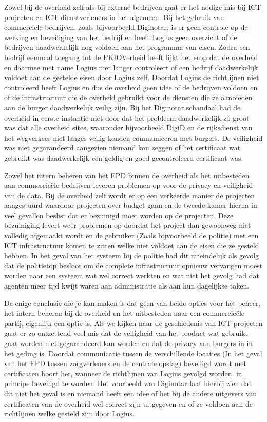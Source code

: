 Zowel bij de overheid zelf als bij externe bedrijven gaat er het nodige mis bij ICT projecten en ICT dienstverleners in het algemeen. Bij het gebruik van commerciele bedrijven, zoals bijvoorbeeld Diginotar, is er geen controle op de werking en beveiliging van het bedrijf en heeft Logius geen overzicht of de bedrijven daadwerkelijk nog voldoen aan het programma van eisen. Zodra een bedrijf eenmaal toegang tot de PKIOVerheid heeft lijkt het erop dat de overheid en daarmee met name Logius niet langer controleert of een bedrijf daadwerkelijk voldoet aan de gestelde eisen door Logius zelf. Doordat Logius de richtlijnen niet controleerd heeft Logius en dus de overheid geen idee of de bedrijven voldoen en of de infrastructuur die de overheid gebruikt voor de diensten die ze aanbieden aan de burger daadwerkelijk veilig zijn. Bij het Diginotar schandaal had de overheid in eerste instantie niet door dat het probleem daadwerkelijk zo groot was dat alle overheid sites, waaronder bijvoorbeeld DigiD en de rijksdienst van het wegverkeer niet langer veilig konden communiceren met burgers. De veiligheid was niet gegarandeerd aangezien niemand kon zeggen of het certificaat wat gebruikt was daadwerkelijk een geldig en goed gecontroleerd certificaat was.

Zowel het intern beheren van het EPD binnen de overheid als het uitbesteden aan commercie\"{e}le bedrijven leveren problemen op voor de privacy en veiligheid van de data. Bij de overheid zelf wordt er op een verkeerde manier de projecten aangestuurd waardoor projecten over budget gaan en de tweede kamer hierna in veel gevallen beslist dat er bezuinigd moet worden op de projecten. Deze bezuiniging levert weer problemen op doordat het project dan gewoonweg niet volledig afgemaakt wordt en de gebruiker (Zoals bijvoorbeeld de politie) met een ICT infrastructuur komen te zitten welke niet voldoet aan de eisen die ze gesteld hebben. In het geval van het systeem bij de politie had dit uiteindelijk als gevolg dat de politietop besloot om de complete infrastructuur opnieuw vervangen moest worden naar een systeem wat wel correct werkten en wat niet het gevolg had dat agenten meer tijd kwijt waren aan administratie als aan hun dagelijkse taken.

De enige conclusie die je kan maken is dat geen van beide opties voor het beheer, het intern beheren bij de overheid en het uitbesteden naar een commercie\"{e}le partij, eigenlijk een optie is. Als we kijken naar de geschiedenis van ICT projecten gaat er zo ontzettend veel mis dat de veiligheid van het product wat gebruikt gaat worden niet gegarandeerd kan worden en dat de privacy van burgers in in het geding is. Doordat communicatie tussen de verschillende locaties (In het geval van het EPD tussen zorgverleners en de centrale opslag) beveiligd wordt met certificaten hoort het, wanneer de richtlijnen van Logius gevolgd worden, in principe beveiligd te worden. Het voorbeeld van Diginotar laat hierbij zien dat dit niet het geval is en niemand heeft een idee of het bij de andere uitgevers van certificaten van de overheid wel correct zijn uitgegeven en of ze voldoen aan de richtlijnen welke gesteld zijn door Logius.

